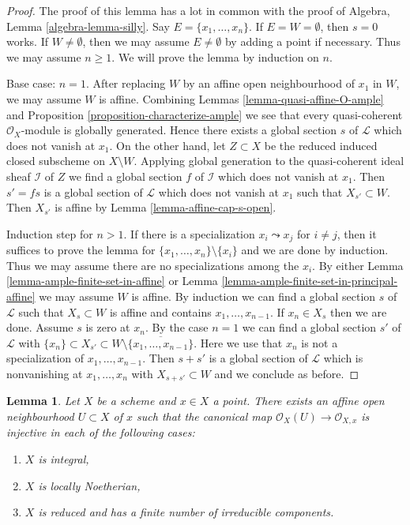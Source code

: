 \documentclass{stacks-project}
\theoremstyle{plain}
\newtheorem{lemma}[subsection]{Lemma}
\theoremstyle{definition}
\theoremstyle{remark}
\numberwithin{equation}{subsection}
\begin{document}
\begin{proof}
The proof of this lemma has a lot in common with the proof of
Algebra, Lemma \ref{algebra-lemma-silly}.
Say $E = \{x_1, \ldots, x_n\}$. If $E = W = \emptyset$, then $s = 0$
works. If $W \not = \emptyset$, then we may assume $E \not = \emptyset$
by adding a point if necessary. Thus we may assume $n \geq 1$.
We will prove the lemma by induction on $n$.

\medskip\noindent
Base case: $n = 1$. After replacing $W$ by an affine open neighbourhood
of $x_1$ in $W$, we may assume $W$ is affine. Combining
Lemmas \ref{lemma-quasi-affine-O-ample} and
Proposition \ref{proposition-characterize-ample}
we see that every quasi-coherent
$\mathcal{O}_X$-module is globally generated.
Hence there exists
a global section $s$ of $\mathcal{L}$ which does not vanish at $x_1$.
On the other hand, let $Z \subset X$ be the
reduced induced closed subscheme on $X \setminus W$.
Applying global generation to the quasi-coherent ideal sheaf
$\mathcal{I}$ of $Z$ we find a global section $f$ of $\mathcal{I}$
which does not vanish at $x_1$. Then $s' = fs$ is a global section
of $\mathcal{L}$ which does not vanish at $x_1$ such that
$X_{s'} \subset W$. Then $X_{s'}$ is affine by
Lemma \ref{lemma-affine-cap-s-open}.

\medskip\noindent
Induction step for $n > 1$. If there is a specialization
$x_i \leadsto x_j$ for $i \not = j$, then it suffices
to prove the lemma for $\{x_1, \ldots, x_n\} \setminus \{x_i\}$
and we are done by induction. Thus we may assume there are no
specializations among the $x_i$.
By either Lemma \ref{lemma-ample-finite-set-in-affine} or
Lemma \ref{lemma-ample-finite-set-in-principal-affine}
we may assume $W$ is affine.
By induction we can find a global section
$s$ of $\mathcal{L}$ such that $X_s \subset W$ is affine and contains
$x_1, \ldots, x_{n - 1}$. If $x_n \in X_s$ then we are done.
Assume $s$ is zero at $x_n$. By the case $n = 1$ we can find
a global section $s'$ of $\mathcal{L}$ with
$\{x_n\} \subset X_{s'} \subset
W \setminus \overline{\{x_1, \ldots, x_{n - 1}\}}$.
Here we use that $x_n$ is not a specialization of $x_1, \ldots, x_{n - 1}$.
Then $s + s'$
is a global section of $\mathcal{L}$ which is nonvanishing
at $x_1, \ldots, x_n$ with $X_{s + s'} \subset W$ and
we conclude as before.
\end{proof}

\begin{lemma}
\label{lemma-ring-affine-open-injective-local-ring}
Let $X$ be a scheme and $x \in X$ a point. There exists an affine open
neighbourhood $U \subset X$ of $x$ such that the canonical map
$\mathcal{O}_X(U) \to \mathcal{O}_{X, x}$ is injective in each of
the following cases:
\begin{enumerate}
\item $X$ is integral,
\item $X$ is locally Noetherian,
\item $X$ is reduced and has a finite number of irreducible components.
\end{enumerate}
\end{lemma}
\end{document}
